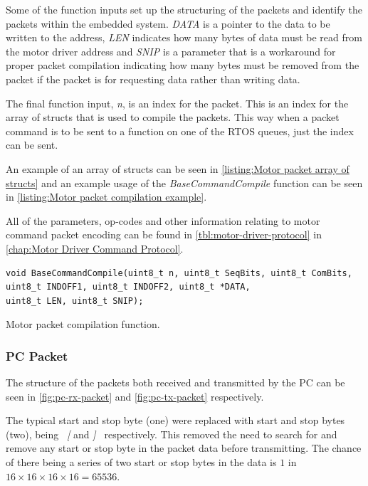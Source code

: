 Some of the function inputs set up the structuring of the packets and identify the packets within the embedded system. \textit{DATA} is a pointer to the data to be written to the address, \textit{LEN} indicates how many bytes of data must be read from the motor driver address and \textit{SNIP} is a parameter that is a workaround for proper packet compilation indicating how many bytes must be removed from the packet if the packet is for requesting data rather than writing data.

The final function input, \textit{n}, is an index for the packet. This is an index for the array of structs that is used to compile the packets. This way when a packet command is to be sent to a function on one of the RTOS queues, just the index can be sent. 

An example of an array of structs can be seen in \cref{listing:Motor packet array of structs} and an example usage of the \textit{BaseCommandCompile} function can be seen in \cref{listing:Motor packet compilation example}.

All of the parameters, op-codes and other information relating to motor command packet encoding can be found in \cref{tbl:motor-driver-protocol} in \cref{chap:Motor Driver Command Protocol}.

\begin{listing}[]
\begin{verbatim}
void BaseCommandCompile(uint8_t n, uint8_t SeqBits, uint8_t ComBits, 
uint8_t INDOFF1, uint8_t INDOFF2, uint8_t *DATA, 
uint8_t LEN, uint8_t SNIP);
\end{verbatim}
\caption{Motor packet compilation function.}
\label{listing:Motor packet compilation function}
\end{listing}

\subsubsection{PC Packet}

The structure of the packets both received and transmitted by the PC can be seen in \cref{fig:pc-rx-packet} and \cref{fig:pc-tx-packet} respectively.

The typical start and stop byte (one) were replaced with start and stop bytes (two), being \textit{~[} and \textit{]~} respectively. This removed the need to search for and remove any start or stop byte in the packet data before transmitting. The chance of there being a series of two start or stop bytes in the data is $1$ in $16\times 16\times 16\times 16 = 65536$. 

